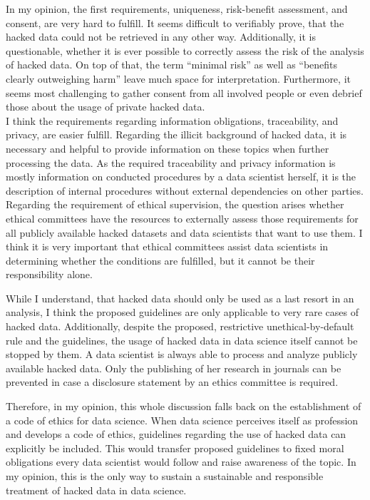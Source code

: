 In my opinion, the first requirements, uniqueness, risk-benefit assessment, and consent, are very hard to fulfill.
It seems difficult to verifiably prove, that the hacked data could not be retrieved in any other way.
Additionally, it is questionable, whether it is ever possible to correctly assess the risk of the analysis of hacked data.
On top of that, the term ``minimal risk'' as well as ``benefits clearly outweighing harm'' leave much space for interpretation.
Furthermore, it seems most challenging to gather consent from all involved people or even debrief those about the usage of private hacked data.\\
I think the requirements regarding information obligations, traceability, and privacy, are easier fulfill.
Regarding the illicit background of hacked data, it is necessary and helpful to provide information on these topics when further processing the data.
As the required traceability and privacy information is mostly information on conducted procedures by a data scientist herself, it is the description of internal procedures without external dependencies on other parties.\\
Regarding the requirement of ethical supervision, the question arises whether ethical committees have the resources to externally assess those requirements for all publicly available hacked datasets and data scientists that want to use them.
I think it is very important that ethical committees assist data scientists in determining whether the conditions are fulfilled, but it cannot be their responsibility alone.

While I understand, that hacked data should only be used as a last resort in an analysis, I think the proposed guidelines are only applicable to very rare cases of hacked data.
Additionally, despite the proposed, restrictive unethical-by-default rule and the guidelines, the usage of hacked data in data science itself cannot be stopped by them.
A data scientist is always able to process and analyze publicly available hacked data.
Only the publishing of her research in journals can be prevented in case a disclosure statement by an ethics committee is required.

Therefore, in my opinion, this whole discussion falls back on the establishment of a code of ethics for data science.
When data science perceives itself as profession and develops a code of ethics, guidelines regarding the use of hacked data can explicitly be included.
This would transfer proposed guidelines to fixed moral obligations every data scientist would follow and raise awareness of the topic.
In my opinion, this is the only way to sustain a sustainable and responsible treatment of hacked data in data science.
